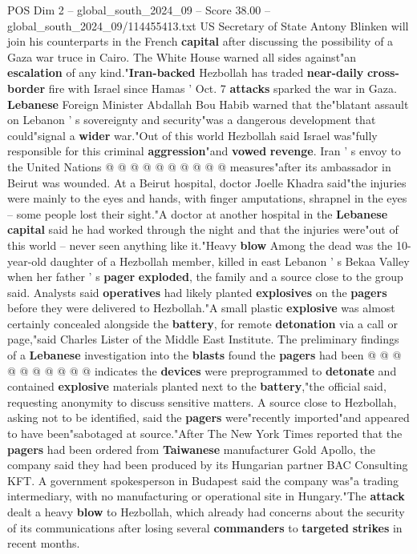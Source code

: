 \begin{textsample}{POS Dim 2 – global\_south\_2024\_09 – Score 38.00 – global\_south\_2024\_09/114455413.txt}
US Secretary of State Antony Blinken will join his counterparts in the French \textbf{capital} after discussing the possibility of a Gaza war truce in Cairo.
The White House warned all sides against"an \textbf{escalation} of any kind."\textbf{Iran-backed} Hezbollah has traded \textbf{near-daily} \textbf{cross-border} fire with Israel since Hamas ' Oct. 7 \textbf{attacks} sparked the war in Gaza. \textbf{Lebanese} Foreign Minister Abdallah Bou Habib warned that the"blatant assault on Lebanon ' s sovereignty and security"was a dangerous development that could"signal a \textbf{wider} war."Out of this world Hezbollah said Israel was"fully responsible for this criminal \textbf{aggression}"and \textbf{vowed} \textbf{revenge}.
Iran ' s envoy to the United Nations @ @ @ @ @ @ @ @ @ @ measures"after its ambassador in Beirut was wounded.
At a Beirut hospital, doctor Joelle Khadra said"the injuries were mainly to the eyes and hands, with finger amputations, shrapnel in the eyes -- some people lost their sight."A doctor at another hospital in the \textbf{Lebanese} \textbf{capital} said he had worked through the night and that the injuries were"out of this world -- never seen anything like it."Heavy \textbf{blow} Among the dead was the 10-year-old daughter of a Hezbollah member, killed in east Lebanon ' s Bekaa Valley when her father ' s \textbf{pager} \textbf{exploded}, the family and a source close to the group said.
Analysts said \textbf{operatives} had likely planted \textbf{explosives} on the \textbf{pagers} before they were delivered to Hezbollah."A small plastic \textbf{explosive} was almost certainly concealed alongside the \textbf{battery}, for remote \textbf{detonation} via a call or page,"said Charles Lister of the Middle East Institute.
The preliminary findings of a \textbf{Lebanese} investigation into the \textbf{blasts} found the \textbf{pagers} had been @ @ @ @ @ @ @ @ @ @ indicates the \textbf{devices} were preprogrammed to \textbf{detonate} and contained \textbf{explosive} materials planted next to the \textbf{battery},"the official said, requesting anonymity to discuss sensitive matters.
A source close to Hezbollah, asking not to be identified, said the \textbf{pagers} were"recently imported"and appeared to have been"sabotaged at source."After The New York Times reported that the \textbf{pagers} had been ordered from \textbf{Taiwanese} manufacturer Gold Apollo, the company said they had been produced by its Hungarian partner BAC Consulting KFT.
A government spokesperson in Budapest said the company was"a trading intermediary, with no manufacturing or operational site in Hungary."The \textbf{attack} dealt a heavy \textbf{blow} to Hezbollah, which already had concerns about the security of its communications after losing several \textbf{commanders} to \textbf{targeted} \textbf{strikes} in recent months.

\end{textsample}
